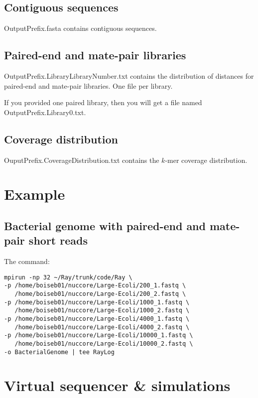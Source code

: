 \documentclass{article}
\begin{document}
\subsection{Contiguous sequences}

OutputPrefix.fasta contains contiguous sequences.

\subsection{Paired-end and mate-pair libraries}

OutputPrefix.LibraryLibraryNumber.txt contains the distribution of distances for paired-end and mate-pair libraries. One file per library.

If you provided one paired library, then you will get a file named OutputPrefix.Library0.txt.

\subsection{Coverage distribution}

OuputPrefix.CoverageDistribution.txt contains the $k$-mer coverage distribution.

\section{Example}

\subsection{Bacterial genome with paired-end and mate-pair short reads}

The command:

\begin{verbatim}
mpirun -np 32 ~/Ray/trunk/code/Ray \
-p /home/boiseb01/nuccore/Large-Ecoli/200_1.fastq \
   /home/boiseb01/nuccore/Large-Ecoli/200_2.fastq \
-p /home/boiseb01/nuccore/Large-Ecoli/1000_1.fastq \
   /home/boiseb01/nuccore/Large-Ecoli/1000_2.fastq \
-p /home/boiseb01/nuccore/Large-Ecoli/4000_1.fastq \
   /home/boiseb01/nuccore/Large-Ecoli/4000_2.fastq \
-p /home/boiseb01/nuccore/Large-Ecoli/10000_1.fastq \
   /home/boiseb01/nuccore/Large-Ecoli/10000_2.fastq \
-o BacterialGenome | tee RayLog
\end{verbatim}

\section{Virtual sequencer \& simulations}
\end{document}

